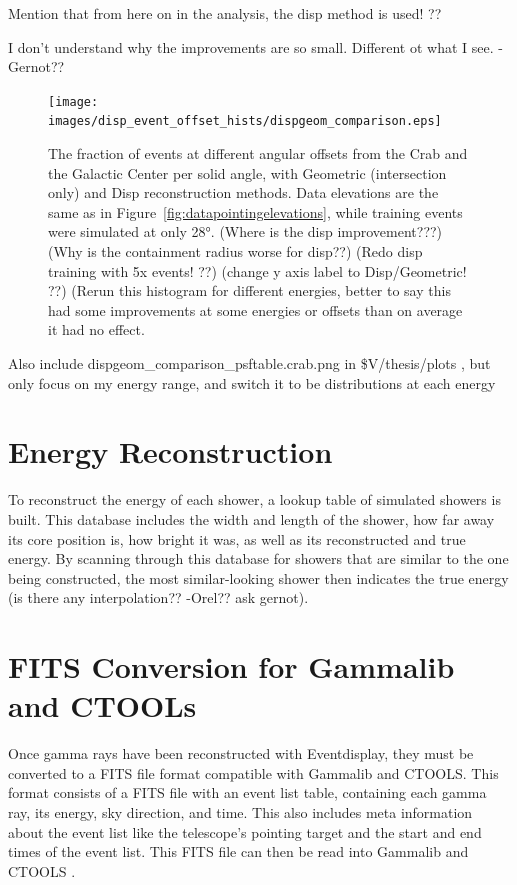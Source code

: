     {\color{red} Mention that from here on in the analysis, the disp method is used! ??}
  
    {\color{red}I don't understand why the improvements are so small.  Different ot what I see. -Gernot?? }

    \begin{figure}[ht]
      \centering
      \texttt{[image: images/disp\_event\_offset\_hists/dispgeom\_comparison.eps]}
      \caption[DISP Offset Improvement]{
        The fraction of events at different angular offsets from the Crab and the Galactic Center per solid angle, with Geometric (intersection only) and Disp reconstruction methods.
        Data elevations are the same as in Figure~\ref{fig:datapointingelevations}, while training events were simulated at only \ang{28}.
        {\color{red}(Where is the disp improvement???)}
        {\color{red}(Why is the containment radius worse for disp??)}
        {\color{red}(Redo disp training with 5x events! ??)}
        {\color{red}(change y axis label to Disp/Geometric! ??)}
        {\color{red}(Rerun this histogram for different energies, better to say this had some improvements at some energies or offsets than on average it had no effect.}
      }
      \label{fig:disp_event_offset}
    \end{figure}
  
  {\color{red}Also include dispgeom\_comparison\_psftable.crab.png in \$V/thesis/plots , but only focus on my energy range, and switch it to be distributions at each energy}

  \FloatBarrier

\section{Energy Reconstruction}\label{subsec:enrecon}
  To reconstruct the energy of each shower, a lookup table of simulated showers is built.
This database includes the width and length of the shower, how far away its core position is, how bright it was, as well as its reconstructed and true energy.
  By scanning through this database for showers that are similar to the one being constructed, the most similar-looking shower then indicates the true energy {\color{red} (is there any interpolation?? -Orel?? ask gernot)}.


\section{FITS Conversion for Gammalib and CTOOLs}\label{fitsconversion}
  Once gamma rays have been reconstructed with Eventdisplay, they must be converted to a FITS file format compatible with Gammalib and CTOOLS.
  This format consists of a FITS file with an event list table, containing each gamma ray, its energy, sky direction, and time.
  This also includes meta information about the event list like the telescope's pointing target and the start and end times of the event list.
  This FITS file can then be read into Gammalib and CTOOLS \cite{gammalibctools}.

